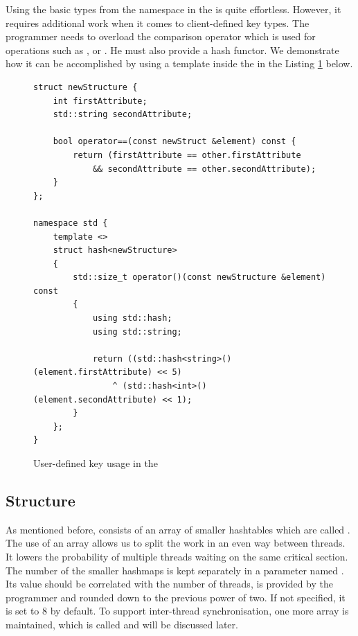        Using the basic types from the \std namespace in the \NvmHashMap is quite effortless.
        However, it requires additional work when it comes to client-defined key types.
        The programmer needs to overload the comparison operator which is used for operations such as \insertMethod, \getMethod or \removeMethod.
        He must also provide a hash functor.
        We demonstrate how it can be accomplished by using a template inside the \std in the Listing \ref{StdHashOverload} below.
            
\begin{figure}[ht]
\renewcommand{\figurename}{Listing}
\begin{lstlisting}
struct newStructure {
    int firstAttribute;
    std::string secondAttribute;
    
    bool operator==(const newStruct &element) const {
        return (firstAttribute == other.firstAttribute 
            && secondAttribute == other.secondAttribute);
    }
};

namespace std {
    template <>
    struct hash<newStructure>
    {
        std::size_t operator()(const newStructure &element) const
        {
            using std::hash;
            using std::string;

            return ((std::hash<string>()(element.firstAttribute) << 5)
                ^ (std::hash<int>()(element.secondAttribute) << 1);
        }
    };
}
\end{lstlisting}
\caption{User-defined key usage in the \NvmHashMap}
\label{StdHashOverload}
\end{figure}

    \subsection{Structure}

        As mentioned before, \NvmHashMap consists of an array of smaller hashtables which are called \internalHashMaps.
        The use of an array allows us to split the work in an even way between threads. 
        It lowers the probability of multiple threads waiting on the same critical section.
        The number of the smaller hashmaps is kept separately in a parameter named \internalMapsCount. 
        Its value should be correlated with the number of threads, is provided by the programmer and rounded down to the previous power of two.
        If not specified, it is set to 8 by default. 
        To support inter-thread synchronisation, one more array is maintained, which is called \locks and will be discussed later.

